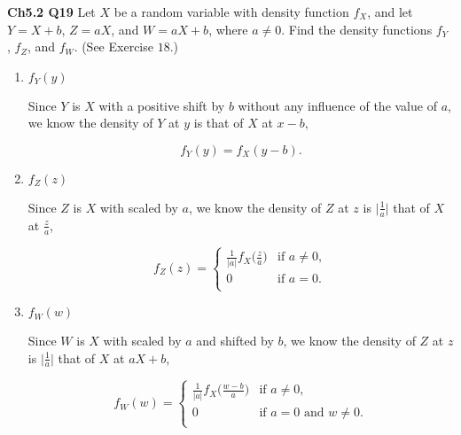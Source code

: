 \documentclass[12pt]{article}
\begin{document}

\noindent
\textbf{Ch5.2 Q19} Let $X$ be a random variable with density function $f_X$, and let $Y = X + b$, $Z = aX$, and $W = aX + b$, where $a \neq 0$. Find the density functions $f_Y$ , $f_Z$, and $f_W$. (See Exercise $18$.)

\begin{enumerate}[label=(\roman*)]
\item $f_Y(y)$

Since $Y$ is $X$ with a positive shift by $b$ without any influence of the value of $a$, we know the density of $Y$ at $y$ is that of $X$ at $x-b$,

\begin{equation*}
f_Y(y) = f_X(y-b).
\end{equation*}

\item $f_Z(z)$

Since $Z$ is $X$ with scaled by $a$, we know the density of $Z$ at $z$ is $\lvert \frac{1}{a} \rvert$ that of $X$ at $\frac{z}{a}$,

\begin{equation*}
f_Z(z) =  \begin{cases} 
	  \frac{1}{\lvert a \rvert}  f_X \Big (\frac{z}{a} \Big ) & \text{if } a \neq 0, \\
      0 & \text{if } a = 0. \\
      \end{cases}
\end{equation*}

\item $f_W(w)$

Since $W$ is $X$ with scaled by $a$ and shifted by $b$, we know the density of $Z$ at $z$ is $\lvert \frac{1}{a} \rvert$ that of $X$ at $aX + b$,

\begin{equation*}
f_W(w) =  \begin{cases} 
	  \frac{1}{\lvert a \rvert}  f_X \Big ( \frac{w-b}{a} \Big ) & \text{if } a \neq 0, \\
      0 & \text{if } a = 0 \text{ and } w \neq 0. \\
      \end{cases}
\end{equation*}
\end{enumerate}
\end{document}
